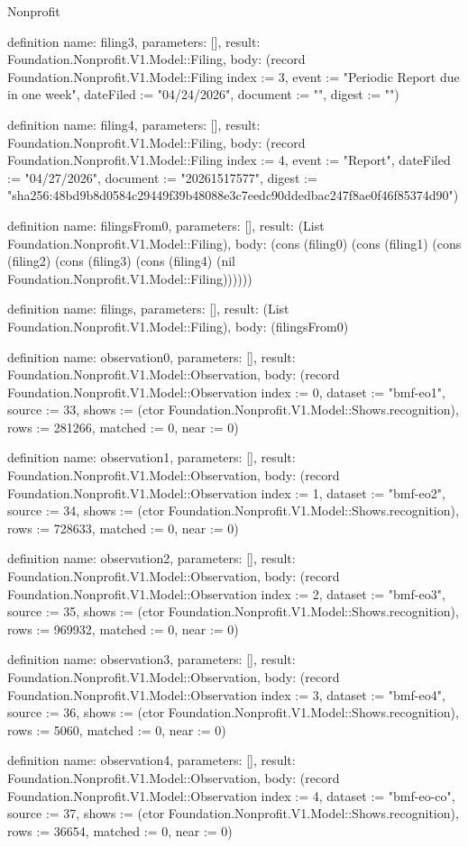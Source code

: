 \begin{lexlean}{Nonprofit}
\begin{semanticmodule}
definition{
  name: filing3,
  parameters: [],
  result: Foundation.Nonprofit.V1.Model::Filing,
  body: (record Foundation.Nonprofit.V1.Model::Filing {index := 3, event := "Periodic Report due in one week", dateFiled := "04/24/2026", document := "", digest := ""})
}

definition{
  name: filing4,
  parameters: [],
  result: Foundation.Nonprofit.V1.Model::Filing,
  body: (record Foundation.Nonprofit.V1.Model::Filing {index := 4, event := "Report", dateFiled := "04/27/2026", document := "20261517577", digest := "sha256:48bd9b8d0584c29449f39b48088e3c7eedc90ddedbac247f8ae0f46f85374d90"})
}

definition{
  name: filingsFrom0,
  parameters: [],
  result: (List Foundation.Nonprofit.V1.Model::Filing),
  body: (cons (filing0) (cons (filing1) (cons (filing2) (cons (filing3) (cons (filing4) (nil Foundation.Nonprofit.V1.Model::Filing))))))
}

definition{
  name: filings,
  parameters: [],
  result: (List Foundation.Nonprofit.V1.Model::Filing),
  body: (filingsFrom0)
}

definition{
  name: observation0,
  parameters: [],
  result: Foundation.Nonprofit.V1.Model::Observation,
  body: (record Foundation.Nonprofit.V1.Model::Observation {index := 0, dataset := "bmf-eo1", source := 33, shows := (ctor Foundation.Nonprofit.V1.Model::Shows.recognition), rows := 281266, matched := 0, near := 0})
}

definition{
  name: observation1,
  parameters: [],
  result: Foundation.Nonprofit.V1.Model::Observation,
  body: (record Foundation.Nonprofit.V1.Model::Observation {index := 1, dataset := "bmf-eo2", source := 34, shows := (ctor Foundation.Nonprofit.V1.Model::Shows.recognition), rows := 728633, matched := 0, near := 0})
}

definition{
  name: observation2,
  parameters: [],
  result: Foundation.Nonprofit.V1.Model::Observation,
  body: (record Foundation.Nonprofit.V1.Model::Observation {index := 2, dataset := "bmf-eo3", source := 35, shows := (ctor Foundation.Nonprofit.V1.Model::Shows.recognition), rows := 969932, matched := 0, near := 0})
}

definition{
  name: observation3,
  parameters: [],
  result: Foundation.Nonprofit.V1.Model::Observation,
  body: (record Foundation.Nonprofit.V1.Model::Observation {index := 3, dataset := "bmf-eo4", source := 36, shows := (ctor Foundation.Nonprofit.V1.Model::Shows.recognition), rows := 5060, matched := 0, near := 0})
}

definition{
  name: observation4,
  parameters: [],
  result: Foundation.Nonprofit.V1.Model::Observation,
  body: (record Foundation.Nonprofit.V1.Model::Observation {index := 4, dataset := "bmf-eo-co", source := 37, shows := (ctor Foundation.Nonprofit.V1.Model::Shows.recognition), rows := 36654, matched := 0, near := 0})
}


\end{semanticmodule}
\end{lexlean}
